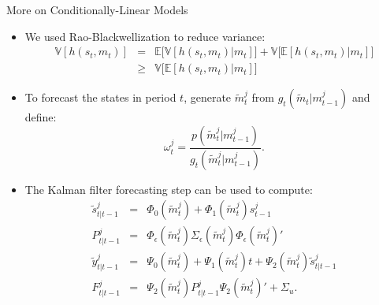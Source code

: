 \documentclass[presentation]{beamer}
\newcommand{\be}{\begin{equation}}
\newcommand{\ee}{\end{equation}}
\begin{document}
\begin{frame}[label={sec:orge4948b1}]{More on Conditionally-Linear Models}
	\begin{itemize}
		\item We used Rao-Blackwellization to reduce variance:
		\begin{eqnarray*}
\mathbb{V}[h(s_t,m_t)] &=& \mathbb{E} \big[ \mathbb{V}[h(s_t,m_t)|m_t] \big] + \mathbb{V} \big[ \mathbb{E}[h(s_t,m_t)|m_t] \big]\\& \ge& \mathbb{V} \big[ \mathbb{E}[h(s_t,m_t)|m_t] \big] 
\end{eqnarray*}
        \item To forecast the states in period $t$,
generate $\tilde{m}^j_t$ from  $g_t(\tilde{m}_t|m_{t-1}^j)$ and define:
\be
\omega_t^j = \frac{p(\tilde{m}_t^j|m_{t-1}^j)}{g_t(\tilde{m}_t^j|m_{t-1}^j)}.
\label{eq_generalpfomegacondlinear}
\ee
\item The Kalman filter
forecasting step can be used to compute:
\be
\begin{array}{lcl}
	\tilde{s}_{t|t-1}^j &=&  \Phi_0(\tilde{m}^j_t) + \Phi_1(\tilde{m}^j_t) s_{t-1}^j  \\
	P_{t|t-1}^j &=& \Phi_\epsilon(\tilde{m}^j_t) \Sigma_\epsilon(\tilde{m}^j_t) \Phi_\epsilon(\tilde{m}^j_t)' \\
	\tilde{y}_{t|t-1}^j &=& \Psi_0(\tilde{m}^j_t) + \Psi_1(\tilde{m}^j_t) t + \Psi_2(\tilde{m}^j_t) \tilde{s}_{t|t-1}^j \\ F_{t|t-1}^j &=& \Psi_2(\tilde{m}^j_t) P_{t|t-1}^j \Psi_2(\tilde{m}^j_t)' + \Sigma_u.
\end{array}
\label{eq_pfforeccondlinear}
\ee
\end{itemize}
\end{frame}
\end{document}
